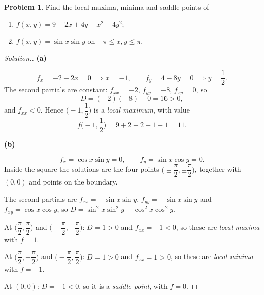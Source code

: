 \documentclass[11pt,a4paper]{article}
\theoremstyle{definition}
\newtheorem{problemx}{Problem}[subsection]
\newenvironment{problem}{\begin{problemx}}{\end{problemx}}
\newenvironment{solution}
  {\renewcommand{\qedsymbol}{}\begin{proof}[\textit{Solution}.]}
  {\end{proof}}
\newcommand{\subhead}[1]{%
  \par\medskip\noindent\textbf{#1}\par\nobreak\smallskip}
\begin{document}
\begin{problem}
Find the local maxima, minima and saddle points of
\begin{enumerate}
\item[(a)] $f(x,y) = 9-2x+4y-x^2-4y^2$;
\item[(b)] $f(x,y) = \sin x\sin y$ on $-\pi\leq x,y\leq\pi$.
\end{enumerate}
\end{problem}
\begin{solution}
\subhead{(a)}
$$f_x = -2-2x = 0 \implies x = -1,\qquad
f_y = 4-8y = 0 \implies y = \frac12 .$$
The second partials are constant: $f_{xx} = -2$, $f_{yy} = -8$, $f_{xy} = 0$, so
$$D = (-2)(-8) - 0 = 16 > 0 ,$$
and $f_{xx}<0$. Hence $\Big(-1,\dfrac12\Big)$ is a \emph{local maximum}, with
value
$$f\Big(-1,\frac12\Big) = 9+2+2-1-1 = 11 .$$

\subhead{(b)}
$$f_x = \cos x\sin y = 0,\qquad f_y = \sin x\cos y = 0 .$$
Inside the square the solutions are the four points
$\Big(\pm\dfrac{\pi}{2},\pm\dfrac{\pi}{2}\Big)$, together with $(0,0)$ and
points on the boundary.

The second partials are $f_{xx} = -\sin x\sin y$, $f_{yy} = -\sin x\sin y$ and
$f_{xy} = \cos x\cos y$, so $D = \sin^2x\sin^2y - \cos^2x\cos^2y$.

At $\Big(\dfrac{\pi}{2},\dfrac{\pi}{2}\Big)$ and
$\Big(-\dfrac{\pi}{2},-\dfrac{\pi}{2}\Big)$: $D = 1>0$ and $f_{xx} = -1<0$, so
these are \emph{local maxima} with $f = 1$.

At $\Big(\dfrac{\pi}{2},-\dfrac{\pi}{2}\Big)$ and
$\Big(-\dfrac{\pi}{2},\dfrac{\pi}{2}\Big)$: $D = 1>0$ and $f_{xx} = 1>0$, so
these are \emph{local minima} with $f = -1$.

At $(0,0)$: $D = -1<0$, so it is a \emph{saddle point}, with $f = 0$.
\end{solution}
\end{document}
